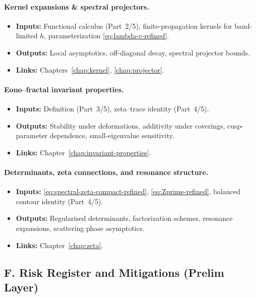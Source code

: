 \paragraph{Kernel expansions \& spectral projectors.}
\begin{itemize}
  \item \textbf{Inputs:} Functional calculus (Part~2/5), finite-propagation kernels for band-limited $h$, parameterization \eqref{eq:lambda-c-refined}.
  \item \textbf{Outputs:} Local asymptotics, off-diagonal decay, spectral projector bounds.
  \item \textbf{Links:} Chapters~\ref{chap:kernel}, \ref{chap:projector}.
\end{itemize}

\paragraph{Eono–fractal invariant properties.}
\begin{itemize}
  \item \textbf{Inputs:} Definition (Part~3/5), zeta–trace identity (Part~4/5).
  \item \textbf{Outputs:} Stability under deformations, additivity under coverings, cusp-parameter dependence, small-eigenvalue sensitivity.
  \item \textbf{Links:} Chapter~\ref{chap:invariant-properties}.
\end{itemize}

\paragraph{Determinants, zeta connections, and resonance structure.}
\begin{itemize}
  \item \textbf{Inputs:} \eqref{eq:spectral-zeta-compact-refined}, \eqref{eq:Zprime-refined}, balanced contour identity (Part~4/5).
  \item \textbf{Outputs:} Regularized determinants, factorization schemes, resonance expansions, scattering phase asymptotics.
  \item \textbf{Links:} Chapter~\ref{chap:zeta}.
\end{itemize}


\subsection*{F. Risk Register and Mitigations (Prelim Layer)}
\label{subsec:risks-refined}

